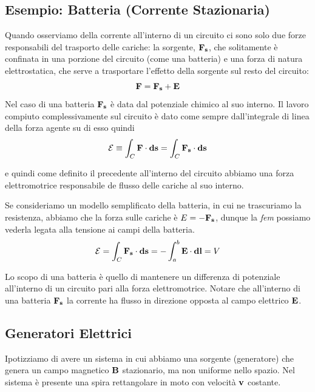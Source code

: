 \subsection{Esempio: Batteria (Corrente Stazionaria)}

Quando osserviamo della corrente all'interno di un circuito ci sono solo  due forze responsabili del trasporto delle cariche: la sorgente, $\bold{F_s}$, che solitamente  \`e confinata in una porzione del circuito (come una batteria) e una forza di natura elettrostatica, che serve a trasportare l'effetto della sorgente sul  resto del circuito:
\begin{equation}
	\bold{F} = \bold{F_s}  + \bold{E}
\end{equation}
Nel caso di una batteria $\bold{F_s}$ \`e data dal potenziale chimico al suo interno. Il lavoro compiuto complessivamente sul circuito \`e dato come sempre dall'integrale di linea della forza agente su di esso quindi 
\begin{equation*}
	\mathcal{E} \equiv \int_{C} \bold{F} \cdot \bold{ds} = \int_C  \bold{F_s}  \cdot \bold{ds}
\end{equation*}

e quindi come definito il precedente all'interno del circuito  abbiamo una forza elettromotrice responsabile de flusso delle cariche al suo interno.  

Se consideriamo un modello semplificato della batteria, in cui ne trascuriamo la resistenza,  abbiamo che la forza sulle cariche \`e  $E = -\bold{F_s} $, dunque la \textit{fem} possiamo vederla legata alla tensione ai campi della batteria.
\begin{equation*}
	\mathcal{E} = \int_{C} \bold{F_s} \cdot \bold{ds} = - \int_{a}^b \bold{E} \cdot \bold{dl} = V
\end{equation*}

Lo scopo di una batteria \`e  quello di mantenere un differenza di potenziale all'interno di un circuito pari alla forza elettromotrice. Notare che all'interno di una batteria $\bold{F_s}$ la corrente ha flusso in direzione opposta al campo elettrico $\bold{E}$.


\subsection{Generatori Elettrici}

Ipotizziamo di avere un sistema in cui abbiamo una sorgente (generatore) che genera un campo magnetico $\bold{B}$ stazionario, ma non uniforme nello spazio. Nel sistema \`e presente una spira rettangolare in moto con velocit\`a $\bold{v}$ costante.

